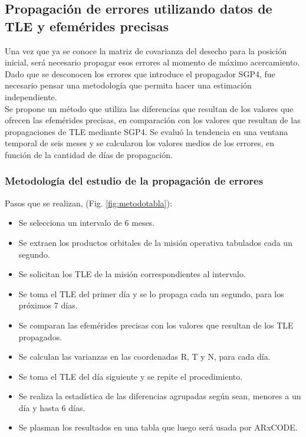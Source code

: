 \subsection{Propagaci\'on de errores utilizando datos de TLE y efem\'erides precisas}\label{subsec:tablaprop}
Una vez que ya se conoce la matriz de covarianza del desecho para la posici\'on inicial, ser\'a necesario propagar esos errores al momento de m\'aximo acercamiento.
Dado que se desconocen los errores que introduce el propagador SGP4, fue necesario pensar una metodolog\'ia que permita hacer una estimaci\'on independiente.\\

Se propone un m\'etodo que utiliza las diferencias que resultan de los valores que ofrecen las efem\'erides precisas, en comparaci\'on con los valores que resultan de las propagaciones de TLE mediante SGP4. Se evalu\'o la tendencia en una ventana temporal de seis meses y se calcularon los valores medios de los errores, en funci\'on de la cantidad de d\'ias de propagaci\'on.

\subsubsection*{Metodolog\'ia del estudio de la propagaci\'on de errores}\label{subsec:errorProp}
Pasos que se realizan, (Fig. \ref{fig:metodotabla}):
\begin{itemize}
\itemsep0em
\item Se selecciona un intervalo de 6 meses.
\item Se extraen los productos orbitales de la misi\'on operativa tabulados cada un segundo.
\item Se solicitan los TLE de la misi\'on correspondientes al intervalo.
\item Se toma el TLE del primer d\'ia y se lo propaga cada un segundo, para los pr\'oximos 7 d\'ias.
\item Se comparan las efem\'erides precisas con los valores que resultan de los TLE propagados.
\item Se calculan las varianzas en las coordenadas R, T y N, para cada d\'ia.
\item Se toma el TLE del d\'ia siguiente y se repite el procedimiento.
\item Se realiza la estad\'istica  de las diferencias agrupadas seg\'un sean, menores a un d\'ia y hasta 6 d\'ias.
\item Se plasman los resultados en una tabla que luego ser\'a usada por ARxCODE.
\end{itemize}

